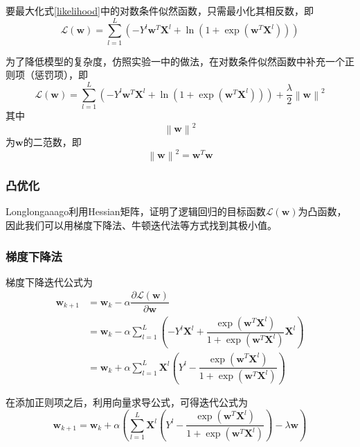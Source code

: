 要最大化式\ref{likelihood}中的对数条件似然函数，只需最小化其相反数，即
\begin{equation}
    \mathcal{L} (\mathbf{w})=\sum^L_{l=1}\left(-Y^l\mathbf{w}^T\mathbf{X}^l+\ln\left(1+\exp\left(\mathbf{w}^T\mathbf{X}^l\right)\right)\right)
\end{equation}

为了降低模型的复杂度，仿照实验一中的做法，在对数条件似然函数中补充一个正则项（惩罚项），即
\begin{equation}
    \mathcal{L} (\mathbf{w})=\sum^L_{l=1}\left(-Y^l\mathbf{w}^T\mathbf{X}^l+\ln\left(1+\exp\left(\mathbf{w}^T\mathbf{X}^l\right)\right)\right)+\dfrac{\lambda}{2}\left\lVert \mathbf{w}\right\rVert ^2
\end{equation}
其中
\begin{equation}
    \left\lVert \mathbf{w}\right\rVert ^2 
\end{equation}
为$\mathbf{w}$的二范数，即
\begin{equation}
    \left\lVert \mathbf{w}\right\rVert ^2=\mathbf{w}^T\mathbf{w}
\end{equation}

\subsubsection{凸优化}

Longlongaaago\cite{tu}利用Hessian矩阵，证明了逻辑回归的目标函数$\mathcal{L} (\mathbf{w})$为凸函数，因此我们可以用梯度下降法、牛顿迭代法等方式找到其极小值。

\subsubsection{梯度下降法}

梯度下降迭代公式为
\begin{align}
    \mathbf{w}_{k+1}
    &= \mathbf{w}_k-\alpha\dfrac{\partial\mathcal{L}(\mathbf{w})}{\partial\mathbf{w}} \\
    &= \mathbf{w}_k-\alpha\sum^L_{l=1}\left(-Y^l\mathbf{X}^l+\dfrac{\exp\left(\mathbf{w}^T\mathbf{X}^l\right)}{1+\exp\left(\mathbf{w}^T\mathbf{X}^l\right)}\mathbf{X}^l\right) \\
    &= \mathbf{w}_k+\alpha\sum^L_{l=1}\mathbf{X}^l\left(Y^l-\dfrac{\exp\left(\mathbf{w}^T\mathbf{X}^l\right)}{1+\exp\left(\mathbf{w}^T\mathbf{X}^l\right)}\right)
\end{align}

在添加正则项之后，利用向量求导公式\cite{dvec}，可得迭代公式为
\begin{equation}
    \label{gd_final}
    \mathbf{w}_{k+1}=\mathbf{w}_k+\alpha\left(\sum^L_{l=1}\mathbf{X}^l\left(Y^l-\dfrac{\exp\left(\mathbf{w}^T\mathbf{X}^l\right)}{1+\exp\left(\mathbf{w}^T\mathbf{X}^l\right)}\right)-\lambda\mathbf{w}\right)
\end{equation}

